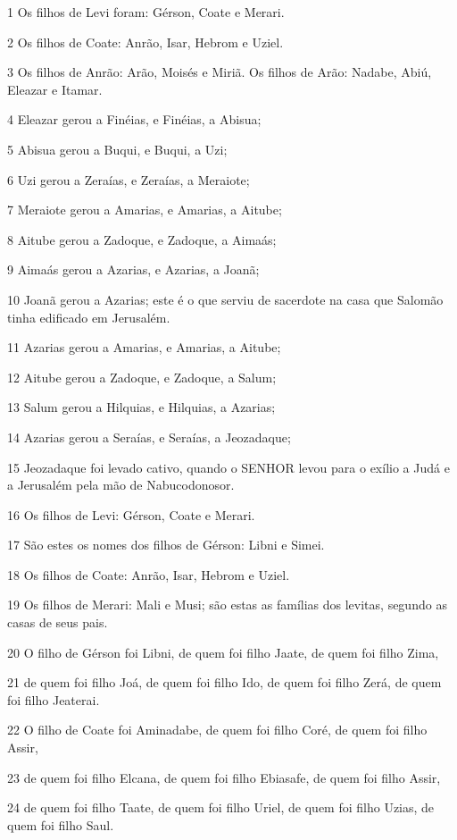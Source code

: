 \par 1 Os filhos de Levi foram: Gérson, Coate e Merari.
\par 2 Os filhos de Coate: Anrão, Isar, Hebrom e Uziel.
\par 3 Os filhos de Anrão: Arão, Moisés e Miriã. Os filhos de Arão: Nadabe, Abiú, Eleazar e Itamar.
\par 4 Eleazar gerou a Finéias, e Finéias, a Abisua;
\par 5 Abisua gerou a Buqui, e Buqui, a Uzi;
\par 6 Uzi gerou a Zeraías, e Zeraías, a Meraiote;
\par 7 Meraiote gerou a Amarias, e Amarias, a Aitube;
\par 8 Aitube gerou a Zadoque, e Zadoque, a Aimaás;
\par 9 Aimaás gerou a Azarias, e Azarias, a Joanã;
\par 10 Joanã gerou a Azarias; este é o que serviu de sacerdote na casa que Salomão tinha edificado em Jerusalém.
\par 11 Azarias gerou a Amarias, e Amarias, a Aitube;
\par 12 Aitube gerou a Zadoque, e Zadoque, a Salum;
\par 13 Salum gerou a Hilquias, e Hilquias, a Azarias;
\par 14 Azarias gerou a Seraías, e Seraías, a Jeozadaque;
\par 15 Jeozadaque foi levado cativo, quando o SENHOR levou para o exílio a Judá e a Jerusalém pela mão de Nabucodonosor.
\par 16 Os filhos de Levi: Gérson, Coate e Merari.
\par 17 São estes os nomes dos filhos de Gérson: Libni e Simei.
\par 18 Os filhos de Coate: Anrão, Isar, Hebrom e Uziel.
\par 19 Os filhos de Merari: Mali e Musi; são estas as famílias dos levitas, segundo as casas de seus pais.
\par 20 O filho de Gérson foi Libni, de quem foi filho Jaate, de quem foi filho Zima,
\par 21 de quem foi filho Joá, de quem foi filho Ido, de quem foi filho Zerá, de quem foi filho Jeaterai.
\par 22 O filho de Coate foi Aminadabe, de quem foi filho Coré, de quem foi filho Assir,
\par 23 de quem foi filho Elcana, de quem foi filho Ebiasafe, de quem foi filho Assir,
\par 24 de quem foi filho Taate, de quem foi filho Uriel, de quem foi filho Uzias, de quem foi filho Saul.
